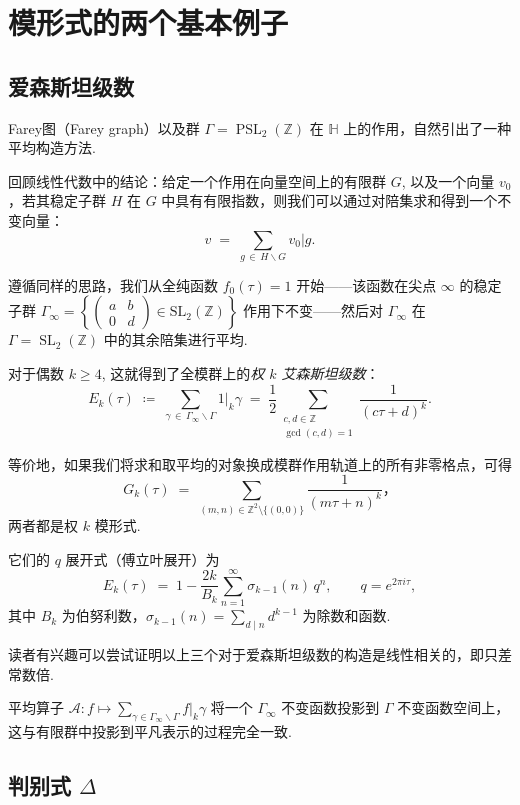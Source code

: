 \documentclass[10pt,UTF8]{ctexart}
\newcommand{\Z}{\mathbb{Z}}
\newcommand{\HH}{\mathbb{H}} %
\newcommand{\SL}{\operatorname{SL}_2(\Z)}
\newcommand{\PSL}{\operatorname{PSL}_2(\Z)}
\theoremstyle{definition}
\theoremstyle{remark}
\begin{document}
\section{模形式的两个基本例子}

\subsection{爱森斯坦级数}
\label{subsec:Eisenstein_series}

Farey图（Farey graph）以及群 $\Gamma = \PSL$ 在 $\HH$ 上的作用，自然引出了一种平均构造方法.

回顾线性代数中的结论：给定一个作用在向量空间上的有限群 $G$, 以及一个向量 $v_0$，若其稳定子群 $H$ 在 $G$ 中具有有限指数，则我们可以通过对陪集求和得到一个不变向量：
\[
v \;=\; \sum_{g\,\in\,H\backslash G} v_0|g .
\]

遵循同样的思路，我们从全纯函数 $f_0(\tau) = 1$ 开始——该函数在尖点 $\infty$ 的稳定子群 $\Gamma_\infty = \left\{ \begin{pmatrix} a & b \\ 0 & d \end{pmatrix} \in \mathrm{SL}_2(\mathbb{Z}) \right\}$ 作用下不变——然后对 $\Gamma_\infty$ 在 $\Gamma=\SL$ 中的其余陪集进行平均. 

对于偶数 $k\geq 4$, 这就得到了全模群上的\emph{权 $k$ 艾森斯坦级数}：
\[
E_k(\tau) \;\coloneqq\; \sum_{\gamma\,\in\,\Gamma_\infty\backslash\Gamma} 1\big|_k\gamma
        \;=\; \frac{1}{2}\!\!\sum_{\substack{c,d\in\Z\\ \gcd(c,d)=1}} \frac{1}{(c\tau+d)^k}.
\]

等价地，如果我们将求和取平均的对象换成模群作用轨道上的所有非零格点，可得
\[
G_k(\tau) \;=\; \sum_{(m,n)\in\Z^2\setminus\{(0,0)\}} \frac{1}{(m\tau+n)^k}，
\]
两者都是权 $k$ 模形式. 

它们的 $q$ 展开式（傅立叶展开）\cite{Zagier2008}为
\[
E_k(\tau) \;=\; 1 - \frac{2k}{B_k}\sum_{n=1}^\infty \sigma_{k-1}(n)\,q^n,
\qquad q=e^{2\pi i\tau},
\]
其中 $B_k$ 为伯努利数，$\sigma_{k-1}(n)=\sum_{d\mid n}d^{k-1}$ 为除数和函数. 

读者有兴趣可以尝试证明以上三个对于爱森斯坦级数的构造是线性相关的，即只差常数倍. 

平均算子 $\mathcal{A}: f \mapsto \sum_{\gamma\in\Gamma_\infty\backslash\Gamma} f|_k\gamma$ 将一个 $\Gamma_\infty$ 不变函数投影到 $\Gamma$ 不变函数空间上，这与有限群中投影到平凡表示的过程完全一致. 

\subsection{判别式 $\Delta$}
\end{document}
